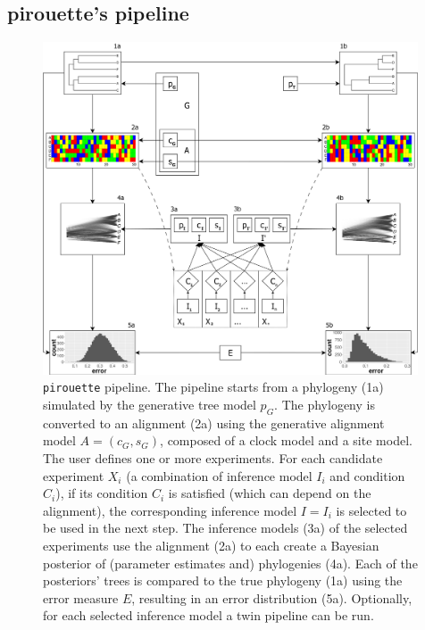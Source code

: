 \subsection{pirouette's pipeline}
\label{subsec:pipeline}

\begin{figure}
  \centering
  \includegraphics[width = 0.99\textwidth]{workflow4.png}
  \caption{
    \texttt{pirouette} pipeline.
    The pipeline starts from a phylogeny (1a) simulated by the 
    generative tree model 
    $\mathit{p_{G}}$.
    The phylogeny is converted to an alignment (2a) using the generative 
    alignment model 
    $\mathit{A} = (\mathit{c_{G}}, \mathit{s_{G}})$, composed of a clock model 
    and a site model. 
    The user defines one or more experiments.
    For each candidate experiment $\mathit{X_{i}}$ 
    (a combination of inference model $\mathit{I_{i}}$ and condition $\mathit{C_{i}}$),
    if its condition $\mathit{C_{i}}$ is 
    satisfied (which can depend on the alignment), 
    the corresponding inference model $\mathit{I} = \mathit{I_{i}}$ is selected
    to be used in the next step.
    The inference models (3a) of the selected experiments use the alignment (2a) 
    to each create a Bayesian posterior of (parameter estimates and) 
    phylogenies (4a). 
    Each of the posteriors' trees is compared to the true phylogeny (1a) 
    using the error measure $\mathit{E}$, 
    resulting in an error distribution (5a). 
    Optionally, for each selected inference model a twin pipeline can be run.
}
\end{figure}
